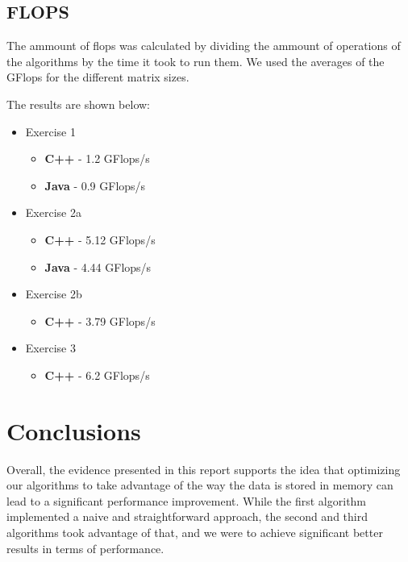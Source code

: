 \documentclass[10pt, titlepage]{extarticle}
\begin{document}
\subsection{FLOPS}\label{FLOPS}

The ammount of flops was calculated by dividing the ammount of operations of the algorithms by the time it took to run them.
We used the averages of the GFlops for the different matrix sizes.

The results are shown below:

\begin{itemize}
    \item Exercise 1
          \begin{itemize}
              \item \textbf{C++} - 1.2 GFlops/s
              \item \textbf{Java} - 0.9 GFlops/s
          \end{itemize}
    \item Exercise 2a
          \begin{itemize}
              \item \textbf{C++} - 5.12 GFlops/s
              \item \textbf{Java} - 4.44 GFlops/s
          \end{itemize}
    \item Exercise 2b
          \begin{itemize}
             \item   \textbf{C++} - 3.79 GFlops/s
          \end{itemize}
    \item Exercise 3
          \begin{itemize}
              \item \textbf{C++} - 6.2 GFlops/s
          \end{itemize}
\end{itemize}


\section{Conclusions}\label{Conclusion}

Overall, the evidence presented in this report supports the idea that optimizing our algorithms to take advantage of the way the data is stored in memory
can lead to a significant performance improvement. While the first algorithm implemented a naive and straightforward approach,
the second and third algorithms took advantage of that, and we were to achieve significant better results in terms of performance.
\end{document}
